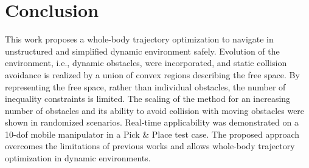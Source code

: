 \section{Conclusion}%
\label{sec:conclusion}

This work proposes a whole-body trajectory optimization to navigate in unstructured and simplified dynamic environment safely. Evolution of the environment, i.e., dynamic obstacles, were incorporated, and static collision avoidance is realized by a union of convex regions describing the free space. By representing the free space, rather than individual obstacles, the number of inequality constraints is limited. The scaling of the method for an increasing number of obstacles and its ability to avoid collision with moving obstacles were shown in randomized scenarios.
Real-time applicability was demonstrated on a 10-\ac{dof} mobile manipulator in a Pick \& Place test case.
The proposed approach overcomes the limitations of previous works and allows whole-body trajectory optimization in dynamic environments. %
%
%
\iffalse
It was shown that coupling of the motion of the mobile robot and the mounted arm dramatically reduces total operational time of the robotic system.

This work proposed an MPC formulation for coupled motion of mobile manipulators using
convex region decomposition to allow safe motions in unknown environments and to reduce
the overall execution time of navigation tasks compared to decoupled approaches.  A new
formulation for collision avoidance in unknown environments was introduced that can fuse
various sensor inputs to create free space regions around individual links.  Simulation
results in randomized test cases show that the gained flexibility by the approach results
in an increase in number of feasible trajectories. At the same time parallelizing the
motion reduces the operation time by $38\%$ on average. The fact that no collision
happened during the test cases highlights the advantage of having guarantees provided by
the MPC formulation. In future works, improved prediction algorithms, which are already
used in mobile robotics, could be integrated. Besides, close-to-singular configurations
that are not prevented in the current formulation, should be addressed in the future.
\fi

